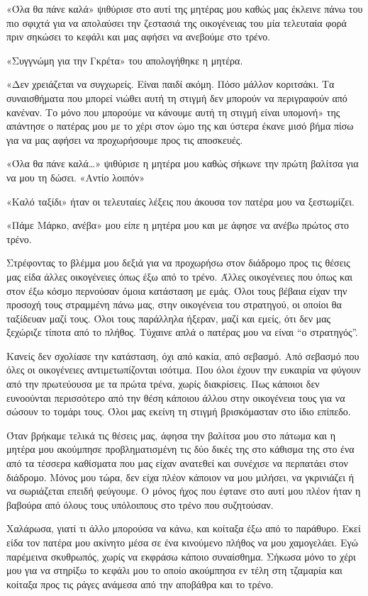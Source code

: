 \documentclass[12pt,twoside, openany]{book}
\begin{document}
«Όλα θα πάνε καλά» ψιθύρισε στο αυτί της μητέρας μου καθώς μας έκλεινε πάνω του πιο σφιχτά για να απολαύσει την ζεστασιά της οικογένειας του μία τελευταία φορά πριν σηκώσει το κεφάλι και μας αφήσει να ανεβούμε στο τρένο.

«Συγγνώμη για την Γκρέτα» του απολογήθηκε η μητέρα.

«Δεν χρειάζεται να συγχωρείς. Είναι παιδί ακόμη. Πόσο μάλλον κοριτσάκι. Τα συναισθήματα που μπορεί νιώθει αυτή τη στιγμή δεν μπορούν να περιγραφούν από κανέναν. Το μόνο που μπορούμε να κάνουμε αυτή τη στιγμή είναι υπομονή» της απάντησε ο πατέρας μου με το χέρι στον ώμο της και ύστερα έκανε μισό βήμα πίσω για να μας αφήσει να προχωρήσουμε προς τις αποσκευές.

«Όλα θα πάνε καλά…» ψιθύρισε η μητέρα μου καθώς σήκωνε την πρώτη βαλίτσα για να μου τη δώσει. «Αντίο λοιπόν»

«Καλό ταξίδι» ήταν οι τελευταίες λέξεις που άκουσα τον πατέρα μου να ξεστωμίζει.

«Πάμε Μάρκο, ανέβα» μου είπε η μητέρα μου και με άφησε να ανέβω πρώτος στο τρένο.

Στρέφοντας το βλέμμα μου δεξιά για να προχωρήσω στον διάδρομο προς τις θέσεις μας είδα άλλες οικογένειες όπως έξω από το τρένο. Άλλες οικογένειες που όπως και στον έξω κόσμο περνούσαν όμοια κατάσταση με εμάς. Όλοι τους βέβαια είχαν την προσοχή τους στραμμένη πάνω μας, στην οικογένεια του στρατηγού, οι οποίοι θα ταξίδευαν μαζί τους. Όλοι τους παράλληλα ήξεραν, μαζί και εμείς, ότι δεν μας ξεχώριζε τίποτα από το πλήθος. Τύχαινε απλά ο πατέρας μου να είναι “ο στρατηγός”.  

Κανείς δεν σχολίασε την κατάσταση, όχι από κακία, από σεβασμό. Από σεβασμό που όλες οι οικογένειες αντιμετωπίζονται ισότιμα. Που όλοι έχουν την ευκαιρία να φύγουν από την πρωτεύουσα με τα πρώτα τρένα, χωρίς διακρίσεις. Πως κάποιοι δεν ευνοούνται περισσότερο από την θέση κάποιου άλλου στην οικογένεια τους για να σώσουν το τομάρι τους. Όλοι μας εκείνη τη στιγμή βρισκόμασταν στο ίδιο επίπεδο.

Όταν βρήκαμε τελικά τις θέσεις μας, άφησα την βαλίτσα μου στο πάτωμα και η μητέρα μου ακούμπησε προβληματισμένη τις δύο δικές της στο κάθισμα της στο ένα από τα τέσσερα καθίσματα που μας είχαν ανατεθεί και συνέχισε να περπατάει στον διάδρομο. Μόνος μου τώρα, δεν είχα πλέον κάποιον να μου μιλήσει, να γκρινιάζει ή να σωριάζεται επειδή φεύγουμε. Ο μόνος ήχος που έφτανε στο αυτί μου πλέον ήταν η βαβούρα από όλους τους υπόλοιπους στο τρένο που συζητούσαν. 

Χαλάρωσα, γιατί τι άλλο μπορούσα να κάνω, και κοίταξα έξω από το παράθυρο. Εκεί είδα τον πατέρα μου ακίνητο μέσα σε ένα κινούμενο πλήθος να μου χαμογελάει. Εγώ παρέμεινα σκυθρωπός, χωρίς να εκφράσω κάποιο συναίσθημα. Σήκωσα μόνο το χέρι μου για να στηρίξω το κεφάλι μου το οποίο ακούμπησα εν τέλη στη τζαμαρία και κοίταξα προς τις ράγες ανάμεσα από την αποβάθρα και το τρένο. 
\end{document}
